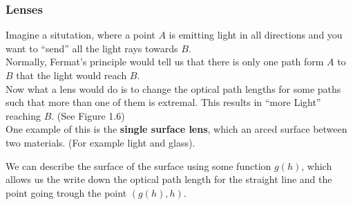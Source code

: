 


\subsubsection{Lenses}
Imagine a situtation, where a point $A$ is emitting light in all directions and you want to ``send'' all the light rays towards $B$.\\ Normally, Fermat's principle would tell us that there is only one path form $A$ to $B$ that the light would reach $B$.\\

Now what a lens would do is to change the optical path lengths for some paths such that more than one of them is extremal. This results in ``more Light'' reaching $B$. (See Figure 1.6)\\


One example of this is the \textbf{single surface lens}, which an arced surface between two materials. (For example light and glass).

We can describe the surface of the surface using some function $g(h)$, which allows us the write down the optical path length for the straight line and the point going trough the point $(g(h),h)$.\\


